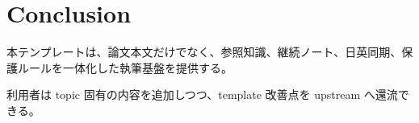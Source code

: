 \section{Conclusion}

本テンプレートは、論文本文だけでなく、参照知識、継続ノート、日英同期、保護ルールを一体化した執筆基盤を提供する。

利用者は topic 固有の内容を追加しつつ、template 改善点を upstream へ還流できる。
